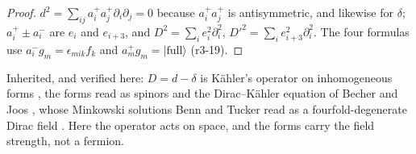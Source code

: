 \begin{proof}
$d^2=\sum_{ij}a^+_ia^+_j\partial_i\partial_j=0$ because $a^+_ia^+_j$ is antisymmetric, and likewise for $\delta$; $a^+_i\pm a^-_i$ are $e_i$ and $e_{i+3}$, and
$D^2=\sum_ie_i^2\partial_i^2$, $D'^2=\sum_ie_{i+3}^2\partial_i^2$. The four formulas use $a^-_ig_m=\epsilon_{mik}f_k$ and $a^+_mg_m=|\mathrm{full}\rangle$ (r3-19).
\end{proof}

Inherited, and verified here: $D=d-\delta$ is K\"ahler's operator on inhomogeneous forms \cite{Kahler62}, the forms read as spinors \cite{Graf78}
and the Dirac--K\"ahler equation of Becher and Joos \cite{BecherJoos82}, whose Minkowski solutions Benn and Tucker read as a
fourfold-degenerate Dirac field \cite{BennTucker83}. Here the operator acts on space, and the forms carry the field strength, not a fermion.

